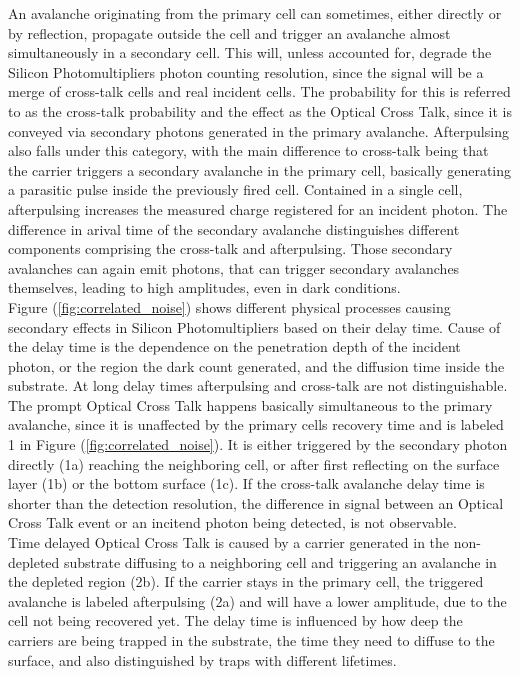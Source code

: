 \documentclass[12pt,article,type=msc,colorback,accentcolor=tud9c]{tudthesis}
\begin{document}
An avalanche originating from the primary cell can sometimes, either directly or by reflection, propagate outside the cell and trigger an avalanche almost simultaneously in a secondary cell. This will, unless accounted for, degrade the Silicon Photomultipliers photon counting resolution, since the signal will be a merge of cross-talk cells and real incident cells. The probability for this is referred to as the cross-talk probability and the effect as the Optical Cross Talk, since it is conveyed via secondary photons generated in the primary avalanche. Afterpulsing also falls under this category, with the main difference to cross-talk being that the carrier triggers a secondary avalanche in the primary cell, basically generating a parasitic pulse inside the previously fired cell. Contained in a single cell, afterpulsing increases the measured charge registered for an incident photon. The difference in arival time of the secondary avalanche distinguishes different components comprising the cross-talk and afterpulsing. Those secondary avalanches can again emit photons, that can trigger secondary avalanches themselves, leading to high amplitudes, even in dark conditions. \\
Figure (\ref{fig:correlated_noise}) shows different physical processes causing secondary effects in Silicon Photomultipliers based on their delay time. Cause of the delay time is the dependence on the penetration depth of the incident photon, or the region the dark count generated, and the diffusion time inside the substrate. At long delay times afterpulsing and cross-talk are not distinguishable. The prompt Optical Cross Talk happens basically simultaneous to the primary avalanche, since it is unaffected by the primary cells recovery time and is labeled 1 in Figure (\ref{fig:correlated_noise}). It is either triggered by the secondary photon directly (1a) reaching the neighboring cell, or after first reflecting on the surface layer (1b) or the bottom surface (1c). If the cross-talk avalanche delay time is shorter than the detection resolution, the difference in signal between an Optical Cross Talk event or an incitend photon being detected, is not observable.\\
Time delayed Optical Cross Talk is caused by a carrier generated in the non-depleted substrate diffusing to a neighboring cell and triggering an avalanche in the depleted region (2b). If the carrier stays in the primary cell, the triggered avalanche is labeled afterpulsing (2a) and will have a lower amplitude, due to the cell not being recovered yet. The delay time is influenced by how deep the carriers are being trapped in the substrate, the time they need to diffuse to the surface, and also distinguished by traps with different lifetimes.\\
\end{document}

